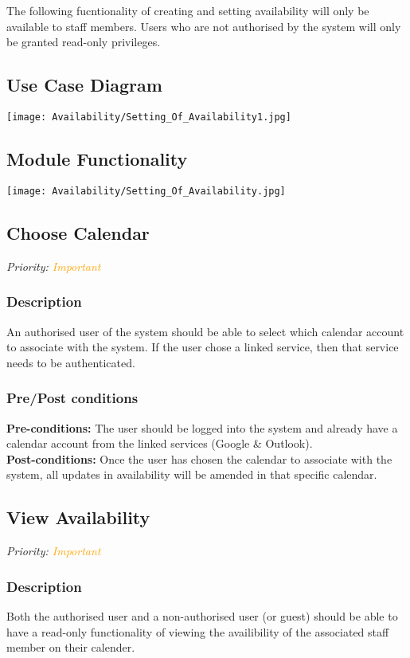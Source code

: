 The following fucntionality of creating and setting availability will only be available to staff members. Users who are not authorised by the system will only be granted read-only privileges.
\subsection{Use Case Diagram}
\texttt{[image: Availability/Setting\_Of\_Availability1.jpg]}

\subsection{Module Functionality}
\texttt{[image: Availability/Setting\_Of\_Availability.jpg]}


\subsection{Choose Calendar}
\textit{Priority: \textcolor{orange}{Important}}
	\subsubsection{Description}
	An authorised user of the system should be able to select which calendar account to associate with the system. If the user chose a linked service, then that service needs to be authenticated.\\
	\subsubsection{Pre/Post conditions}
		\textbf{Pre-conditions:} The user should be logged into the system and already have a calendar account from the linked services (Google \& Outlook). \\
		\textbf{Post-conditions:} Once the user has chosen the calendar to associate with the system, all updates in availability will be amended in that specific calendar.

\subsection{View Availability}
\textit{Priority: \textcolor{orange}{Important}}
	\subsubsection{Description}
	Both the authorised user and a non-authorised user (or guest) should be able to have a read-only functionality of viewing the availibility of the associated staff member on their calender.\\
